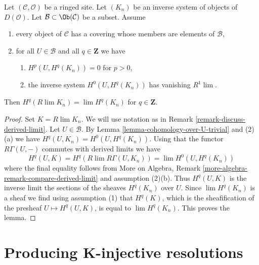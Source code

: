 \begin{lemma}
\label{lemma-derived-limit-suitable-system}
Let $(\mathcal{C}, \mathcal{O})$ be a ringed site. Let $(K_n)$
be an inverse system of objects of $D(\mathcal{O})$.
Let $\mathcal{B} \subset \Ob(\mathcal{C})$ be a subset. Assume
\begin{enumerate}
\item every object of $\mathcal{C}$ has a covering whose members are
elements of $\mathcal{B}$,
\item for all $U \in \mathcal{B}$ and all $q \in \mathbf{Z}$ we have
\begin{enumerate}
\item $H^p(U, H^q(K_n)) = 0$ for $p > 0$,
\item the inverse system $H^0(U, H^q(K_n))$ has vanishing $R^1\lim$.
\end{enumerate}
\end{enumerate}
Then $H^q(R\lim K_n) = \lim H^q(K_n)$ for $q \in \mathbf{Z}$.
\end{lemma}

\begin{proof}
Set $K = R\lim K_n$. We will use notation as in
Remark \ref{remark-discuss-derived-limit}. Let $U \in \mathcal{B}$.
By Lemma \ref{lemma-cohomology-over-U-trivial} and (2)(a)
we have $H^q(U, K_n) = H^0(U, H^q(K_n))$.
Using that the functor $R\Gamma(U, -)$ commutes with
derived limits we have
$$
H^q(U, K) = H^q(R\lim R\Gamma(U, K_n)) = \lim H^0(U, H^q(K_n))
$$
where the final equality follows from
More on Algebra, Remark \ref{more-algebra-remark-compare-derived-limit}
and assumption (2)(b). Thus $H^q(U, K)$ is the inverse limit
the sections of the sheaves $H^q(K_n)$ over $U$. Since
$\lim H^q(K_n)$ is a sheaf we find using assumption (1) that $H^q(K)$,
which is the sheafification of the presheaf $U \mapsto H^q(U, K)$,
is equal to $\lim H^q(K_n)$. This proves the lemma.
\end{proof}







\section{Producing K-injective resolutions}
\label{section-K-injective}

